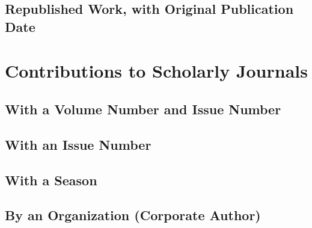 \documentclass{article}
\begin{document}
\subsection{Republished Work, with Original Publication Date} %
\label{sub:republished_work_with_original_publication_date}
\begin{refsection}
	\printbibliography[heading=none]
\end{refsection}

\section{Contributions to Scholarly Journals} %
\label{sec:contributions_to_scholarly_journals}
\subsection{With a Volume Number and Issue Number} %
\label{sub:with_a_volume_number_and_issue_number}
\begin{refsection}
	\printbibliography[heading=none]
\end{refsection}
\subsection{With an Issue Number} %
\label{sub:with_an_issue_number}
\begin{refsection}
	\printbibliography[heading=none]
\end{refsection}
\subsection{With a Season} %
\label{sub:with_a_season}
\begin{refsection}
	\printbibliography[heading=none]
\end{refsection}
\subsection{By an Organization (Corporate Author)} %
\label{sub:by_an_organization_corporate_author}
\begin{refsection}
	\printbibliography[heading=none]
\end{refsection}
\end{document}
